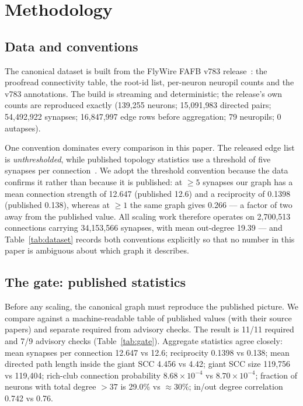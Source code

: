 \documentclass[11pt,a4paper]{article}
\begin{document}
\section{Methodology}
\label{sec:method}

\subsection{Data and conventions}
The canonical dataset is built from the FlyWire FAFB v783 release~\cite{flywire-release}: the
proofread connectivity table, the root-id list, per-neuron neuropil counts and the v783
annotations. The build is streaming and deterministic; the release's own counts are reproduced
exactly (139{,}255 neurons; 15{,}091{,}983 directed pairs; 54{,}492{,}922 synapses; 16{,}847{,}997
edge rows before aggregation; 79 neuropils; 0 autapses).

One convention dominates every comparison in this paper. The released edge list is
\emph{unthresholded}, while published topology statistics use a threshold of five synapses per
connection~\cite{flywire-network}. We adopt the threshold convention because the data confirms
it rather than because it is published: at $\geq5$ synapses our graph has a mean connection
strength of 12.647 (published 12.6) and a reciprocity of 0.1398 (published 0.138), whereas at
$\geq1$ the same graph gives 0.266 --- a factor of two away from the published value. All scaling
work therefore operates on 2{,}700{,}513 connections carrying 34{,}153{,}566 synapses, with mean
out-degree 19.39 --- and Table~\ref{tab:dataset} records both conventions explicitly so that no
number in this paper is ambiguous about which graph it describes.

\label{tab:dataset}


\subsection{The gate: published statistics}
Before any scaling, the canonical graph must reproduce the published picture. We compare against
a machine-readable table of published values (with their source papers) and separate required
from advisory checks. The result is 11/11 required and 7/9 advisory checks
(Table~\ref{tab:gate}). Aggregate statistics agree closely: mean synapses per connection 12.647
vs 12.6; reciprocity 0.1398 vs 0.138; mean directed path length inside the giant SCC 4.456 vs
4.42; giant SCC size 119{,}756 vs 119{,}404; rich-club connection probability
$8.68\times10^{-4}$ vs $8.70\times10^{-4}$; fraction of neurons with total degree $>37$ is
29.0\% vs $\approx$30\%; in/out degree correlation 0.742 vs 0.76.
\end{document}
